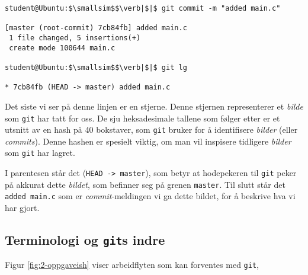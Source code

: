 \begin{alphasection}
\begin{lstlisting}[mathescape=true]
student@Ubuntu:$\smallsim$$\verb|$|$ git commit -m "added main.c" 

[master (root-commit) 7cb84fb] added main.c
 1 file changed, 5 insertions(+)
 create mode 100644 main.c

student@Ubuntu:$\smallsim$$\verb|$|$ git lg

* 7cb84fb (HEAD -> master) added main.c
\end{lstlisting}




Det siste vi ser på denne linjen er en stjerne. Denne stjernen representerer et \textit{bilde} som \verb|git| har tatt for oss. De sju heksadesimale tallene som følger etter er et utsnitt av en hash på 40 bokstaver, som \verb|git| bruker for å identifisere \textit{bilder} (eller \textit{commits}). Denne hashen er spesielt viktig, om man vil inspisere tidligere \textit{bilder} som \verb|git| har lagret.

I parentesen står det (\verb|HEAD -> master|), som betyr at hodepekeren til \verb|git| peker på akkurat dette \textit{bildet}, som befinner seg på grenen \verb|master|. Til slutt står det \verb|added main.c| som er \textit{commit}-meldingen vi ga dette bildet, for å beskrive hva vi har gjort.


\subsection{Terminologi og \texttt{git}s indre}
Figur \ref{fig:2-oppgaveish} viser arbeidflyten som kan forventes med \verb|git|,


\begin{figure}[ht]
    \centering
    


\end{figure}
\end{alphasection}
